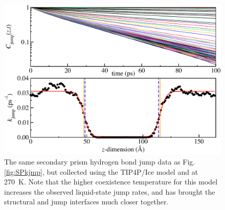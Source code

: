 \begin{figure}
\includegraphics[width=\linewidth]{Figures/secprismJumpPlotTIP4PIce}
\caption{\label{fig:SPTIP4Pkjmp} The same secondary prism hydrogen
  bond jump data as Fig. \ref{fig:SPkjmp}, but collected using the
  TIP4P/Ice model and at 270~K.  Note that the higher coexistence
  temperature for this model increases the observed liquid-state jump
  rates, and has brought the structural and jump interfaces much
  closer together.}
\end{figure}

